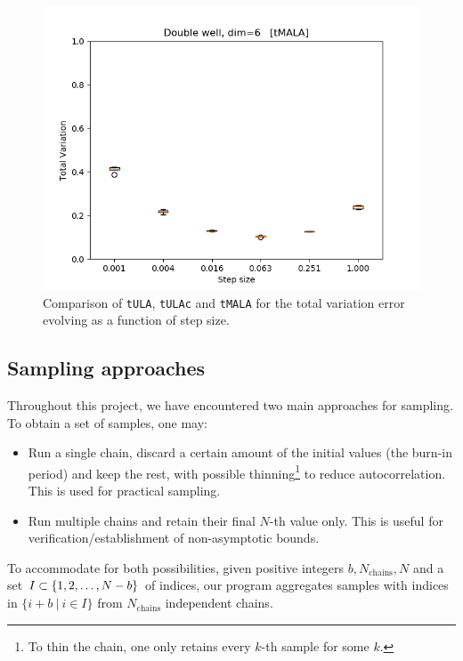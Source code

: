 \begin{figure}[H]
\begin{minipage}[b]{0.32\textwidth}
    \includegraphics[width=\textwidth]{Figures/tmala_tv.png}
  \end{minipage}
   \caption{Comparison of \texttt{tULA}, \texttt{tULAc} and \texttt{tMALA} for the total variation error evolving as a function of step size.}
\end{figure}




\subsection{Sampling approaches}

Throughout this project, we have encountered two main approaches for sampling. To obtain a set of samples, one may:

\begin{itemize}
    \item Run a single chain, discard a certain amount of the initial values (the burn-in period) and keep the rest, with possible thinning\footnote{To thin the chain, one only retains every $k$-th sample for some $k$.} to reduce autocorrelation. This is used for practical sampling.
    \item Run multiple chains and retain their final $N$-th value only. This is useful for verification/establishment of non-asymptotic bounds.
\end{itemize}

To accommodate for both possibilities, given positive integers $b, N_{\text{chains}}, N$ and a set $I \subset \mathbb \{1, 2, \dots, N - b\}$ of indices, our program aggregates samples with indices in $\{i+b\ |\ i \in I\} $  from $ N_{\text{chains}}$ independent chains.

